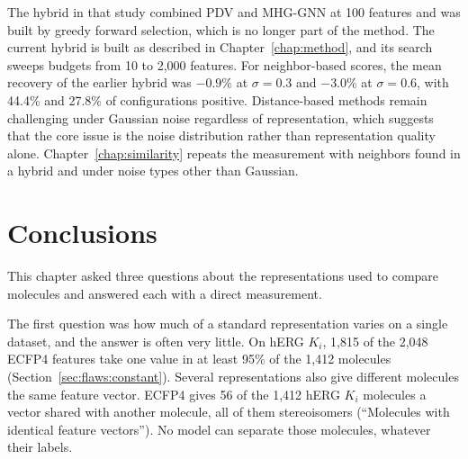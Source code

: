 The hybrid in that study combined PDV and MHG-GNN at 100 features and was built by greedy forward selection, which is no longer part of the method. The current hybrid is built as described in Chapter~\ref{chap:method}, and its search sweeps budgets from 10 to 2,000 features. For neighbor-based scores, the mean recovery of the earlier hybrid was $-0.9\%$ at $\sigma = 0.3$ and $-3.0\%$ at $\sigma = 0.6$, with 44.4\% and 27.8\% of configurations positive. Distance-based methods remain challenging under Gaussian noise regardless of representation, which suggests that the core issue is the noise distribution rather than representation quality alone. Chapter~\ref{chap:similarity} repeats the measurement with neighbors found in a hybrid and under noise types other than Gaussian.

\section{Conclusions}
This chapter asked three questions about the representations used to compare molecules and answered each with a direct measurement.

The first question was how much of a standard representation varies on a single dataset, and the answer is often very little. On hERG $K_i$, 1,815 of the 2,048 ECFP4 features take one value in at least 95\% of the 1,412 molecules (Section~\ref{sec:flaws:constant}). Several representations also give different molecules the same feature vector. ECFP4 gives 56 of the 1,412 hERG $K_i$ molecules a vector shared with another molecule, all of them stereoisomers (``Molecules with identical feature vectors''). No model can separate those molecules, whatever their labels.

